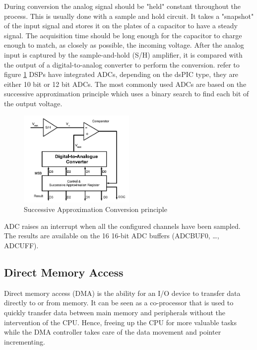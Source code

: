 \vskip 0.2in
\noindent
During conversion the analog signal should be "held" constant throughout the process. This is usually done with a sample and hold circuit. It takes a "snapshot" of the input signal and stores it on the plates of a capacitor to have a steady signal. The acquisition time should be long enough for the capacitor to charge enough to match, as closely as possible, the incoming voltage.
\vskip 0.2in
\noindent
After the analog input is captured by the sample-and-hold (S/H) amplifier, it is compared with the output of a digital-to-analog converter to perform the conversion. refer to figure \ref{fig:sac} 
\vskip 0.2in
\noindent
DSPs have integrated ADCs, depending on the dsPIC type, they are either 10 bit or 12 bit ADCs.  The most commonly used ADCs are based on the successive approximation principle which uses a binary search to find each bit of the output voltage.\\

\begin{figure}[H]
    \centering
    \includegraphics[width=0.5\textwidth]{figures/software/SAC.PNG}
    \caption{Successive Approximation Conversion principle\cite{alex}}
    \label{fig:sac}
\end{figure}
\noindent
ADC raises an interrupt when all the configured channels have been sampled. The results are available on the 16 16-bit ADC buffers (ADCBUF0, …, ADCUFF).


\subsection{Direct Memory Access}

Direct memory access (DMA) is the ability for an I/O device to transfer data directly to or from memory.  It can be seen as a co-processor that is used to quickly transfer data between main memory and peripherals without the intervention of the CPU. Hence, freeing up the CPU for more valuable tasks while the DMA controller takes care of the data movement and pointer incrementing.


